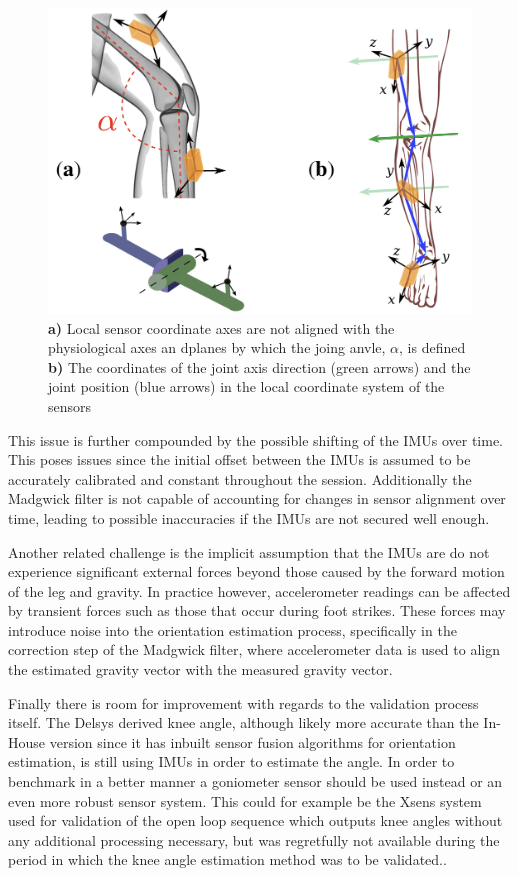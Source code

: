 \begin{figure}
    \centering
    \includegraphics[width=0.75\linewidth]{images/kneeOrientation.png}
    \caption{\textbf{a)} Local sensor coordinate axes are not aligned with the physiological axes an dplanes by which the joing anvle, \(\alpha\), is defined \textbf{b)} The coordinates of the joint axis direction (green arrows) and the joint position (blue arrows) in the local coordinate system of the sensors \cite{seel_imu-based_2014}}
    \label{fig:enter-label}
\end{figure}

This issue is further compounded by the possible shifting of the IMUs over time. This poses issues since the initial offset between the IMUs is assumed to be accurately calibrated and constant throughout the session. Additionally the Madgwick filter is not capable of accounting for changes in sensor alignment over time, leading to possible inaccuracies if the IMUs are not secured well enough.

Another related challenge is the implicit assumption that the IMUs are do not experience significant external forces beyond those caused by the forward motion of the leg and gravity. In practice however, accelerometer readings can be affected by transient forces such as those that occur during foot strikes. These forces may introduce noise into the orientation estimation process, specifically in the correction step of the Madgwick filter, where accelerometer data is used to align the estimated gravity vector with the measured gravity vector.

Finally there is room for improvement with regards to the validation process itself. The Delsys derived knee angle, although likely more accurate than the In-House version since it has inbuilt sensor fusion algorithms for orientation estimation, is still using IMUs in order to estimate the angle. In order to benchmark in a better manner a goniometer sensor should be used instead or an even more robust sensor system. This could for example be the Xsens system used for validation of the open loop sequence which outputs knee angles without any additional processing necessary, but was regretfully not available during the period in which the knee angle estimation method was to be validated.. 


